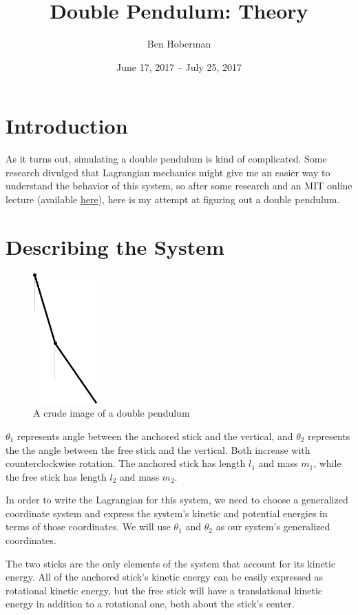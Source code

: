 \documentclass[]{article}
\title{Double Pendulum: Theory}
\author{Ben Hoberman}
\begin{document}
	
\date{June 17, 2017 -- July 25, 2017}
\maketitle

\newcommand{\lagr}{\mathcal{L}}

\section{Introduction}
As it turns out, simulating a double pendulum is kind of complicated. Some research divulged that Lagrangian mechanics might give me an easier way to understand the behavior of this system, so after some research and an MIT online lecture (available \href{https://www.youtube.com/watch?v=zhk9xLjrmi4&t=3925s}{here}), here is my attempt at figuring out a double pendulum.

\section{Describing the System}
\begin{figure}[h!]
	\includegraphics[height=5cm]{situation}
	\caption{A crude image of a double pendulum}
\end{figure}
$\theta_1$ represents angle between the anchored stick and the vertical, and $\theta_2$ represents the the angle between the free stick and the vertical. Both increase with counterclockwise rotation. The anchored stick has length $l_1$ and mass $m_1$, while the free stick has length $l_2$ and mass $m_2$.

In order to write the Lagrangian for this system, we need to choose a generalized coordinate system and express the system's kinetic and potential energies in terms of those coordinates. We will use $\theta_1$ and $\theta_2$ as our system's generalized coordinates.

The two sticks are the only elements of the system that account for its kinetic energy. All of the anchored stick's kinetic energy can be easily expressed as rotational kinetic energy, but the free stick will have a translational kinetic energy in addition to a rotational one, both about the stick's center.
\end{document}
